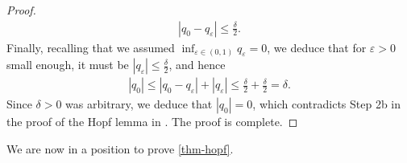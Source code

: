 \documentclass[11pt,reqno]{amsart}
\theoremstyle{plain}
\theoremstyle{definition}
\numberwithin{equation}{section}
\newcommand{\eps}{\varepsilon}
\newcommand{\1}{\mathbbm{1}}
\begin{document}
\begin{proof}
\begin{align*}
    |q_0 - q_{\eps}| \le \frac{\delta}{2}.
\end{align*}
Finally, recalling that we assumed $\inf_{\eps \in (0,1)} q_{\eps} = 0$, we deduce that for $\eps > 0$ small enough, it must be $|q_{\eps}| \le \frac{\delta}{2}$, and hence
\begin{align*}
    |q_0| \le |q_0 - q_{\eps}| + |q_{\eps}| \le \frac{\delta}{2} + \frac{\delta}{2} = \delta.
\end{align*}
Since $\delta > 0$ was arbitrary, we deduce that $|q_0| = 0$, which contradicts Step 2b in the proof of the Hopf lemma in \cite[Theorem 6.10]{RoWe24}. The proof is complete.
\end{proof}

We are now in a position to prove \autoref{thm-hopf}.
\end{document}

